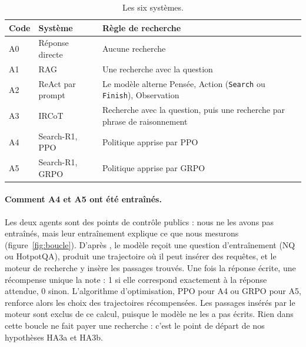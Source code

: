 \begin{table}[ht]
\centering\small
\begin{tabular}{@{}llp{8cm}@{}}
\toprule
Code & Système & Règle de recherche\\
\midrule
A0 & Réponse directe & Aucune recherche\\
A1 & RAG & Une recherche avec la question\\
A2 & ReAct par prompt & Le modèle alterne Pensée, Action (\texttt{Search} ou \texttt{Finish}), Observation\\
A3 & IRCoT & Recherche avec la question, puis une recherche par phrase de raisonnement\\
A4 & Search-R1, PPO & Politique apprise par PPO\\
A5 & Search-R1, GRPO & Politique apprise par GRPO\\
\bottomrule
\end{tabular}
\caption{Les six systèmes.}
\label{tab:sys}
\end{table}

\paragraph{Comment A4 et A5 ont été entraînés.} Les deux agents sont des points de contrôle publics : nous ne les avons pas entraînés, mais leur entraînement explique ce que nous mesurons (figure~\ref{fig:boucle}). D'après \citet{jin2025search}, le modèle reçoit une question d'entraînement (NQ ou HotpotQA), produit une trajectoire où il peut insérer des requêtes, et le moteur de recherche y insère les passages trouvés. Une fois la réponse écrite, une récompense unique la note : 1 si elle correspond exactement à la réponse attendue, 0 sinon. L'algorithme d'optimisation, PPO \citep{schulman2017proximal} pour A4 ou GRPO \citep{shao2024deepseekmath} pour A5, renforce alors les choix des trajectoires récompensées. Les passages insérés par le moteur sont exclus de ce calcul, puisque le modèle ne les a pas écrits. Rien dans cette boucle ne fait payer une recherche : c'est le point de départ de nos hypothèses HA3a et HA3b.


